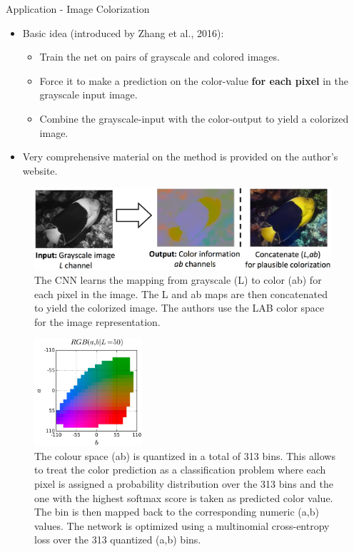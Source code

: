 \begin{vbframe}{Application - Image Colorization}
    \begin{itemize}
        \item Basic idea (introduced by Zhang et al., 2016):
        \begin{itemize}
            \item Train the net on pairs of grayscale and colored images.
            \item Force it to make a prediction on the color-value \textbf{for each pixel} in the grayscale input image.
            \item Combine the grayscale-input with the color-output to yield a colorized image.
        \end{itemize}
        \item Very comprehensive material on the method is provided on the author's website. \href{http://richzhang.github.io/colorization/}{}
            \end{itemize}
            \framebreak
            \begin{figure}
            \centering
            \includegraphics[width=11cm]{figure/fish_lab.png}
            \caption{The CNN learns the mapping from grayscale (L) to color (ab) for each pixel in the image. The L and ab maps are then concatenated to yield the colorized image. The authors use the LAB color space for the image representation.}
            \end{figure}
            \framebreak
            \begin{figure}
            \centering
            \includegraphics[width=4cm]{figure/lab.png}
            \caption{\small The colour space (ab) is quantized in a total of 313 bins. This allows to treat the color prediction as a classification problem where each pixel is assigned a probability distribution over the 313 bins and the one with the highest softmax score is taken as predicted color value. The bin is then mapped back to the corresponding numeric (a,b) values. The network is optimized using a multinomial cross-entropy loss over the 313 quantized (a,b) bins.}

\end{figure}
\end{vbframe}
